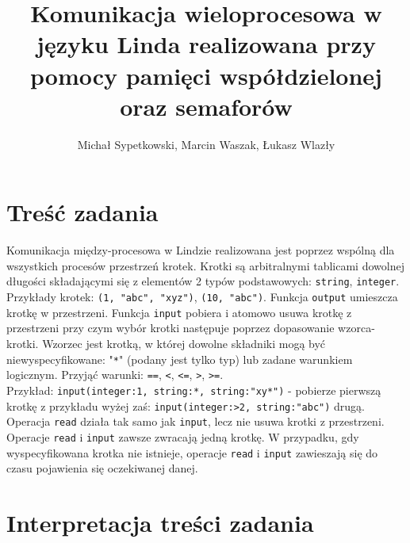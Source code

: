 \documentclass{article}
\title{Komunikacja wieloprocesowa w języku Linda realizowana przy pomocy pamięci współdzielonej oraz semaforów}
\author{Michał Sypetkowski, Marcin Waszak, Łukasz Wlazły}
\date{}
\begin{document}
	\maketitle
	\newpage

	\section{Treść zadania}
	Komunikacja między-procesowa w Lindzie realizowana jest poprzez wspólną dla wszystkich procesów przestrzeń krotek.
    Krotki są arbitralnymi tablicami dowolnej długości składającymi się z elementów 2 typów podstawowych: \texttt{string}, \texttt{integer}.
    Przykłady krotek: \texttt{(1, "abc", "xyz")}, \texttt{(10, "abc")}.
    Funkcja \texttt{output} umieszcza krotkę w przestrzeni.
    Funkcja \texttt{input} pobiera i atomowo usuwa krotkę z przestrzeni przy czym wybór krotki następuje poprzez dopasowanie wzorca-krotki.
    Wzorzec jest krotką, w której dowolne składniki mogą być niewyspecyfikowane: "\texttt{*}" (podany jest tylko typ) lub zadane warunkiem logicznym. Przyjąć warunki: \texttt{==}, \texttt{<}, \texttt{<=}, \texttt{>}, \texttt{>=}. \\
    Przykład: \texttt{input(integer:1, string:*, string:"xy*")} - pobierze pierwszą krotkę z przykładu wyżej zaś: \texttt{input(integer:>2, string:"abc")} drugą.
    Operacja \texttt{read} działa tak samo jak \texttt{input}, lecz nie usuwa krotki z przestrzeni. Operacje \texttt{read} i \texttt{input} zawsze zwracają jedną krotkę.
    W przypadku, gdy wyspecyfikowana krotka nie istnieje, operacje \texttt{read} i \texttt{input} zawieszają się do czasu pojawienia się oczekiwanej danej.

	\section{Interpretacja treści zadania}
\end{document}
